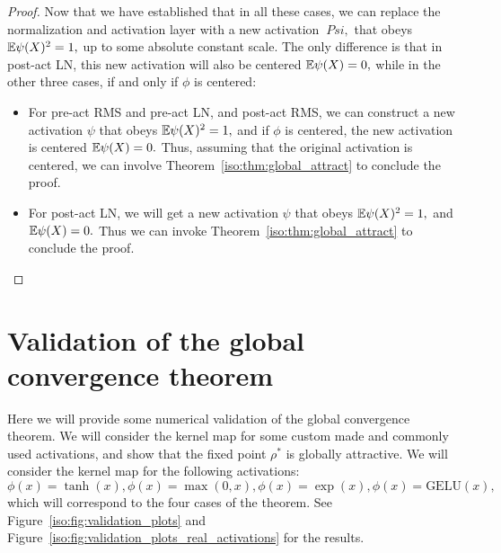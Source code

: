 \begin{proof}
Now that we have established that in all these cases, we can replace the normalization and activation layer with a new activation $\ Psi,$ that obeys $\mathbb{E} \psi(X)^2 = 1,$ up to some absolute constant scale. The only difference is that in post-act LN, this new activation will also be centered $\mathbb{E} \psi(X) = 0,$ while in the other three cases, if and only if $\phi$ is centered:

\begin{itemize}
    \item For pre-act RMS and pre-act LN, and post-act RMS, we can construct a new activation $\psi$ that obeys $\mathbb{E} \psi(X)^2 = 1,$ and if $\phi$ is centered, the new activation is centered $\mathbb{E} \psi(X) = 0.$ Thus, assuming that the original activation is centered, we can involve Theorem~\ref{iso:thm:global_attract} to conclude the proof.
    \item For post-act LN, we will get a new activation $\psi$ that obeys $\mathbb{E} \psi(X)^2 = 1,$ and $\mathbb{E} \psi(X) = 0.$ Thus we can invoke Theorem~\ref{iso:thm:global_attract} to conclude the proof.
\end{itemize}
\end{proof}


\section{Validation of the global convergence theorem}
Here we will provide some numerical validation of the global convergence theorem. We will consider the kernel map for some custom made and commonly used activations, and show that the fixed point $\rho^*$ is globally attractive. We will consider the kernel map for the following activations: $\phi(x) = \tanh(x), \phi(x) = \max(0,x), \phi(x) = \exp(x), \phi(x) = \text{GELU}(x),$ which will correspond to the four cases of the theorem. See Figure~\ref{iso:fig:validation_plots} and Figure~\ref{iso:fig:validation_plots_real_activations} for the results.

